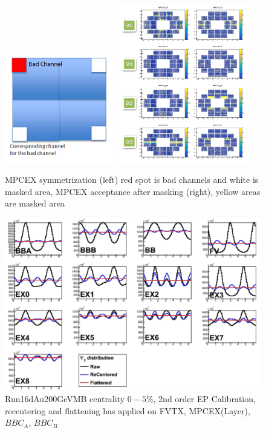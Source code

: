 \documentclass{article}
\begin{document}
\begin{figure}[!htb]
  \centering  
    \includegraphics[width=0.44\textwidth]{fig_pi0vn/mpcex_symmetrize.PNG}
    \includegraphics[width=0.5\textwidth]{fig_pi0vn/mpcex_acceptance.PNG}
  \caption[MPCEX appetance]{MPCEX symmetrization (left) red spot is bad channels and white is masked area, MPCEX acceptance after masking (right), yellow 
  areas are masked area}
  \label{fig:MPCEX Acceptance}
\end{figure}

\begin{figure}[!htb]
  \centering  
    \includegraphics[width=\textwidth]{fig_pi0vn/epcalib_mpcex_fvtx.PNG}
  \caption[d+Au200GeVMB centrality $0-5\%$, 2nd order EP Calibration]{Run16dAu200GeVMB centrality $0-5\%$, 2nd order EP Calibration, recentering and flattening has applied on FVTX, MPCEX(Layer), 
  $BBC_{A}$, $BBC_{B}$}
  \label{fig:EP Calibration for Detectors}
\end{figure}
\end{document}
